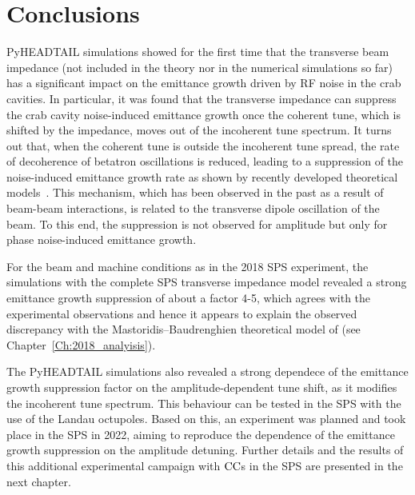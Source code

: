 \section{Conclusions}\label{sec:Ch7_conclusions}
PyHEADTAIL simulations showed for the first time that the transverse beam impedance (not included in the theory nor in the numerical simulations so far) has a significant impact on the emittance growth driven by RF noise in the crab cavities. In particular, it was found that the transverse impedance can suppress the crab cavity noise-induced emittance growth once the coherent tune, which is shifted by the impedance, moves out of the incoherent tune spectrum. It turns out that, when the coherent tune is outside the incoherent tune spread, the rate of decoherence of betatron oscillations is reduced, leading to a suppression of the noise-induced emittance growth rate as shown by recently developed theoretical models~\cite{Buffat:2022dac, van_kamper_presentation_xavier_theory}. This mechanism, which has been observed in the past as a result of beam-beam interactions, is related to the transverse dipole oscillation of the beam. To this end, the suppression is not observed for amplitude but only for phase noise-induced emittance growth.

For the beam and machine conditions as in the 2018 SPS experiment, the simulations with the complete SPS transverse impedance model revealed a strong emittance growth suppression of about a factor 4-5, which agrees with the experimental observations and hence it appears to explain the observed discrepancy with the Mastoridis--Baudrenghien theoretical model of (see Chapter~\ref{Ch:2018_analyisis}). 

The PyHEADTAIL simulations also revealed a strong dependece of the emittance growth suppression factor on the amplitude-dependent tune shift, as it modifies the incoherent tune spectrum. This behaviour can be tested in the SPS with the use of the Landau octupoles. Based on this, an experiment was planned and took place in the SPS in 2022, aiming to reproduce the dependence of the emittance growth suppression on the amplitude detuning. Further details and the results of this additional experimental campaign with ${\mathrm{CC}}$s in the SPS are presented in the next chapter.




